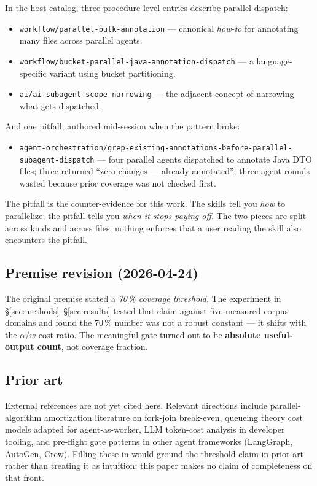 \documentclass[10pt,letterpaper]{article}
\begin{document}
In the host catalog, three procedure-level entries describe parallel
dispatch:
\begin{itemize}
\item \texttt{workflow/parallel-bulk-annotation} --- canonical \emph{how-to}
  for annotating many files across parallel agents.
\item \texttt{workflow/bucket-parallel-java-annotation-dispatch} --- a
  language-specific variant using bucket partitioning.
\item \texttt{ai/ai-subagent-scope-narrowing} --- the adjacent concept of
  narrowing what gets dispatched.
\end{itemize}

And one pitfall, authored mid-session when the pattern broke:
\begin{itemize}
\item \texttt{agent-orchestration/grep-existing-annotations-before-parallel-subagent-dispatch}
  --- four parallel agents dispatched to annotate Java DTO files; three
  returned ``zero changes --- already annotated''; three agent rounds
  wasted because prior coverage was not checked first.
\end{itemize}

The pitfall is the counter-evidence for this work. The skills tell you
\emph{how} to parallelize; the pitfall tells you \emph{when it stops paying
off}. The two pieces are split across kinds and across files; nothing
enforces that a user reading the skill also encounters the pitfall.

\subsection{Premise revision (2026-04-24)}

The original premise stated a \emph{70\,\% coverage threshold}. The
experiment in \S\ref{sec:methods}--\S\ref{sec:results} tested that claim
against five measured corpus domains and found the 70\,\% number was not a
robust constant --- it shifts with the $\alpha/w$ cost ratio. The meaningful
gate turned out to be \textbf{absolute useful-output count}, not coverage
fraction.

\subsection{Prior art}

External references are not yet cited here. Relevant directions include
parallel-algorithm amortization literature on fork-join break-even, queueing
theory cost models adapted for agent-as-worker, LLM token-cost analysis in
developer tooling, and pre-flight gate patterns in other agent frameworks
(LangGraph, AutoGen, Crew). Filling these in would ground the threshold
claim in prior art rather than treating it as intuition; this paper makes
no claim of completeness on that front.
\end{document}
